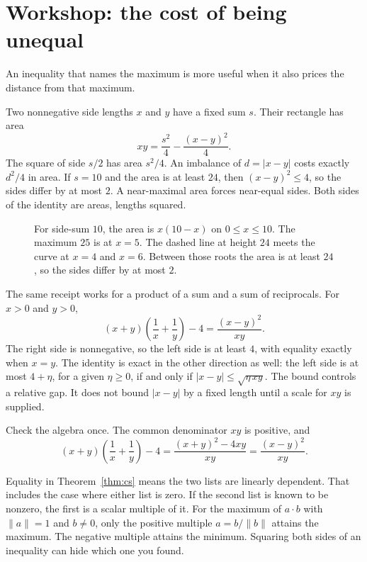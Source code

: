 \section{Workshop: the cost of being unequal}\label{sec:slack}

An inequality that names the maximum is more useful when it also prices the distance from that maximum.

\begin{examplex}
Two nonnegative side lengths $x$ and $y$ have a fixed sum $s$. Their rectangle has area
\[
xy=\frac{s^2}4-\frac{(x-y)^2}4.
\]
The square of side $s/2$ has area $s^2/4$. An imbalance of $d=|x-y|$ costs exactly $d^2/4$ in area. If $s=10$ and the area is at least $24$, then $(x-y)^2\le4$, so the sides differ by at most $2$. A near-maximal area forces near-equal sides. Both sides of the identity are areas, lengths squared.
\end{examplex}

\begin{figure}[ht]
\centering
{}
\caption{For side-sum $10$, the area is $x(10-x)$ on $0\le x\le10$. The maximum $25$ is at $x=5$. The dashed line at height $24$ meets the curve at $x=4$ and $x=6$. Between those roots the area is at least $24$, so the sides differ by at most $2$.}
\label{fig:slack}
\end{figure}

The same receipt works for a product of a sum and a sum of reciprocals. For $x>0$ and $y>0$,
\[
(x+y)\left(\frac1x+\frac1y\right)-4=\frac{(x-y)^2}{xy}.
\]
The right side is nonnegative, so the left side is at least $4$, with equality exactly when $x=y$. The identity is exact in the other direction as well: the left side is at most $4+\eta$, for a given $\eta\ge0$, if and only if $|x-y|\le\sqrt{\eta\,xy}$. The bound controls a relative gap. It does not bound $|x-y|$ by a fixed length until a scale for $xy$ is supplied.

Check the algebra once. The common denominator $xy$ is positive, and
\[
(x+y)\left(\frac1x+\frac1y\right)-4=\frac{(x+y)^2-4xy}{xy}=\frac{(x-y)^2}{xy}.
\]

\begin{reminder}
Equality in Theorem~\ref{thm:cs} means the two lists are linearly dependent. That includes the case where either list is zero. If the second list is known to be nonzero, the first is a scalar multiple of it. For the maximum of $a\cdot b$ with $\|a\|=1$ and $b\ne0$, only the positive multiple $a=b/\|b\|$ attains the maximum. The negative multiple attains the minimum. Squaring both sides of an inequality can hide which one you found.
\end{reminder}


